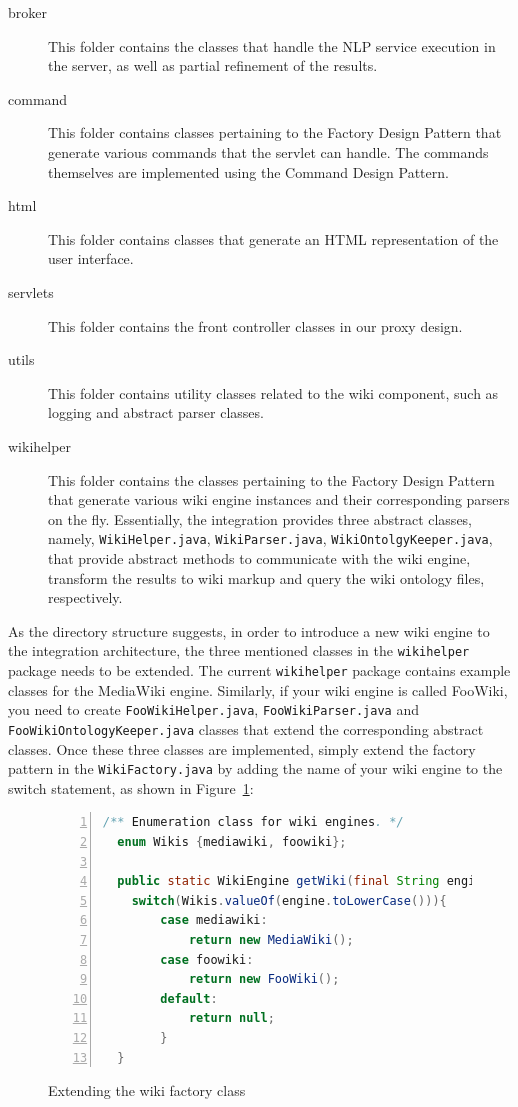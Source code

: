 \begin{description}
\item[broker] This folder contains the classes that handle the NLP service execution in the \sa server, as well as partial refinement of the results.
\item[command] This folder contains classes pertaining to the Factory Design Pattern that generate various commands that the servlet can handle. The commands themselves are implemented using the Command Design Pattern. 
\item[html] This folder contains classes that generate an HTML representation of the \wikinlp user interface.
\item[servlets] This folder contains the front controller classes in our proxy design.
\item[utils] This folder contains utility classes related to the wiki component, such as logging and abstract parser classes.
\item[wikihelper] This folder contains the classes pertaining to the Factory Design Pattern that generate various wiki engine instances and their corresponding parsers on the fly. Essentially, the \wikinlp integration provides three abstract classes, namely, \texttt{WikiHelper.java}, \texttt{WikiParser.java}, \texttt{WikiOntolgyKeeper.java}, that provide abstract methods to communicate with the wiki engine, transform the results to wiki markup and query the wiki ontology files, respectively. 
\end{description}

As the directory structure suggests, in order to introduce a new wiki engine to the integration architecture, the three mentioned classes in the \texttt{wikihelper} package needs to be extended. The current \texttt{wikihelper} package contains example classes for the MediaWiki engine. Similarly, if your wiki engine is called FooWiki, you need to create \texttt{FooWikiHelper.java}, \texttt{FooWikiParser.java} and \texttt{FooWikiOntologyKeeper.java} classes that extend the corresponding abstract classes. Once these three classes are implemented, simply extend the factory pattern in the \texttt{WikiFactory.java} by adding the name of your wiki engine to the switch statement, as shown in Figure~\ref{list:wiki_factory_extend}:

\begin{figure}[h!]
\centering
\begin{lstlisting}[language=Java,numbers=left,xleftmargin=4mm,columns=flexible]
  /** Enumeration class for wiki engines. */
  enum Wikis {mediawiki, foowiki};

  public static WikiEngine getWiki(final String engine){
    switch(Wikis.valueOf(engine.toLowerCase())){
		case mediawiki:
			return new MediaWiki();
		case foowiki:
			return new FooWiki();
		default:
			return null;
		}
  }
\end{lstlisting}
\caption{Extending the wiki factory class}
\label{list:wiki_factory_extend}
\end{figure}

